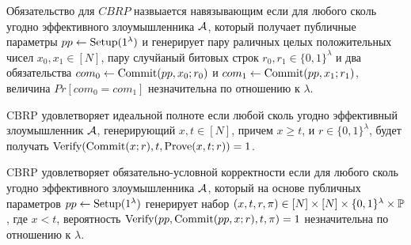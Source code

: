 
\begin{definition}
	Обязательство для $CBRP$ назвыается навязывающим если для любого сколь угодно эффективного злоумышленника $\A$, который получает публичные параметры $pp \leftarrow \Setup(1^\lambda)$ и генерирует пару раличных целых положительных чисел $x_0, x_1 \in [N]$, пару случйаный битовых строк $r_0, r_1 \in \{0, 1\}^\lambda$ и два обязательства $com_0 \leftarrow \Commit(pp, x_0; r_0)$ и $com_1 \leftarrow \Commit(pp, x_1; r_1)$, величина $Pr[com_0 = com_1]$ незначительна по отношению к $\lambda$.
\end{definition}

\begin{definition}
	CBRP удовлетворяет идеальной полноте если любой сколь угодно эффективный злоумышленник $\A$, генерирующий $x, t \in [N]$, причем  $x \geq t$, и $r \in \{0, 1\}^\lambda$, будет получать $\Verify(\Commit(x; r), t, \Prove(x, t; r)) = 1$.
\end{definition}

\begin{definition}
	CBRP удовлетворяет обязательно-условной корректности если для любого сколь угодно эффективного злоумышленника $\A$, который на основе публичных параметров $pp \leftarrow \Setup(1^\lambda)$ генерирует набор $(x, t, r, \pi) \in [N] \times [N] \times \{0, 1\}^\lambda \times \P$, где $x < t$, вероятность $\Verify(pp, \Commit(pp, x; r), t, \pi) = 1$ незначительна по отношению к $\lambda$.
\end{definition}
